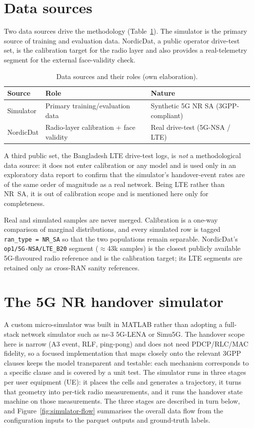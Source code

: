 \section{Data sources}
\label{sec:data}

Two data sources drive the methodology (Table~\ref{tab:datasets}). The simulator
is the primary source of training and evaluation data. NordicDat, a public
operator drive-test set, is the calibration target for the radio layer and also
provides a real-telemetry segment for the external face-validity check.

\begin{table}[ht]
\centering
\caption{Data sources and their roles (own elaboration).}
\label{tab:datasets}
\begin{tabular}{@{}lll@{}}
\toprule
Source & Role & Nature \\
\midrule
Simulator  & Primary training/evaluation data & Synthetic 5G NR SA (3GPP-compliant) \\
NordicDat  & Radio-layer calibration + face validity & Real drive-test (5G-NSA / LTE) \\
\bottomrule
\end{tabular}
\end{table}

A third public set, the Bangladesh LTE drive-test logs, is \emph{not} a
methodological data source: it does not enter calibration or any model and is
used only in an exploratory data report to confirm that the simulator's
handover-event rates are of the same order of magnitude as a real network. Being
LTE rather than NR~SA, it is out of calibration scope and is mentioned here only
for completeness.

Real and simulated samples are never merged. Calibration is a one-way comparison
of marginal distributions, and every simulated row is tagged \texttt{ran\_type =
NR\_SA} so that the two populations remain separable. NordicDat's
\texttt{op1/5G-NSA/LTE\_B20} segment ($\approx$43k samples) is the closest
publicly available 5G-flavoured radio reference and is the calibration target;
its LTE segments are retained only as cross-RAN sanity references.

\section{The 5G NR handover simulator}
\label{sec:simulator}

A custom micro-simulator was built in MATLAB rather than adopting a full-stack
network simulator such as ns-3 5G-LENA or Simu5G. The handover scope here is
narrow (A3 event, RLF, ping-pong) and does not need PDCP/RLC/MAC fidelity, so a
focused implementation that maps closely onto the relevant 3GPP clauses keeps the
model transparent and testable: each mechanism corresponds to a specific clause
and is covered by a unit test. The simulator runs in three stages per user equipment
(UE): it places the cells and generates a trajectory, it turns that geometry into
per-tick radio measurements, and it runs the handover state machine on those
measurements. The three stages are described in turn below, and
Figure~\ref{fig:simulator-flow} summarises the overall data flow from the
configuration inputs to the parquet outputs and ground-truth labels.

